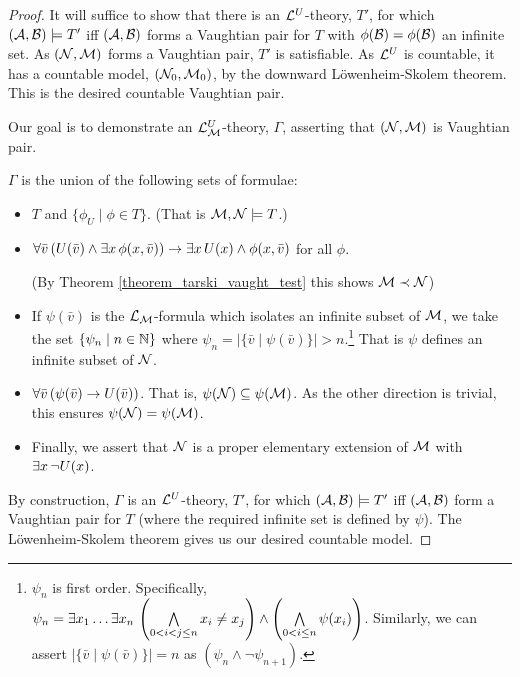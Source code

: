 \begin{proof}
It will suffice to show that there is an \(\mathcal{L}^U\)-theory, \(T'\), for which \((\mathcal{A}, \mathcal{B}) \models T'\) iff \((\mathcal{A}, \mathcal{B})\) forms a Vaughtian pair for \(T\) with \(\phi(\mathcal{B}) = \phi(\mathcal{B})\) an infinite set. 
As \((\mathcal{N}, \mathcal{M})\) forms a Vaughtian pair, \(T'\) is satisfiable.
As \(\mathcal{L}^U\) is countable, it has a countable model, \((\mathcal{N}_0, \mathcal{M}_0)\), by the downward L\"owenheim-Skolem theorem.
This is the desired countable Vaughtian pair. 

Our goal is to demonstrate an \(\mathcal{L}_{\mathcal{M}}^U\)-theory, \(\Gamma\), asserting that \((\mathcal{N}, \mathcal{M})\) is Vaughtian pair.

\(\Gamma\) is the union of the following sets of formulae:
\begin{itemize}
\item \(T\) and \(\{\phi_U \mid \phi \in T\}\). (That is \(\mathcal{M}, \mathcal{N} \models T\).)
\item \(\forall \bar{v} \, (U(\bar{v}) \land \exists x \, \phi(x, \bar{v})) \to \exists x \, U(x) \land \phi(x, \bar{v})\) for all \(\phi\). 

(By Theorem \ref{theorem_tarski_vaught_test} this shows \(\mathcal{M} \prec \mathcal{N}\)) 

\item If \(\psi(\bar{v})\) is the \(\mathcal{L}_{\mathcal{M}}\)-formula which isolates an infinite subset of \(\mathcal{M}\), we take the set \(\{\psi_n \mid n \in \mathbb{N}\}\) where \(\psi_n = |\{\bar{v} \mid \psi(\bar{v})\}| > n\).\footnote{\(\psi_n\) is first order.
Specifically, \(\psi_n = \exists x_1 \ldots \exists x_n \, \left(\bigwedge\limits_{0 <i < j \leq n} x_i \neq x_j\right) \land \left(\bigwedge\limits_{0 < i \leq n} \psi(x_i)\right)\). Similarly, we can assert \(|\{\bar{v} \mid \psi(\bar{v})\}| = n\) as \((\psi_n \land \neg \psi_{n+1})\).}
That is \(\psi\) defines an infinite subset of \(\mathcal{N}\).

\item \(\forall \bar{v} \, (\psi(\bar{v}) \to U(\bar{v}))\). That is, \(\psi(\mathcal{N}) \subseteq \psi(\mathcal{M})\). As the other direction is trivial, this ensures \(\psi(\mathcal{N}) = \psi(\mathcal{M})\). 
\item Finally, we assert that \(\mathcal{N}\) is a proper elementary extension of \(\mathcal{M}\) with \(\exists x \, \neg U(x)\). 
\end{itemize}

By construction, \(\Gamma\) is an \(\mathcal{L}^U\)-theory, \(T'\), for which \((\mathcal{A}, \mathcal{B}) \models T'\) iff \((\mathcal{A}, \mathcal{B})\) form a Vaughtian pair for \(T\) (where the required infinite set is defined by \(\psi\)). 
The L\"owenheim-Skolem theorem gives us our desired countable model. 
\end{proof}

